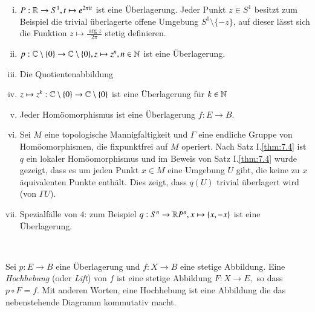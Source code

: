 \documentclass[a4paper,10pt]{scrartcl}
\begin{document}
\begin{exs*}
 \begin{enumerate}[(i)]
  \item $P: \mathbb{R}\to S^1, t\mapsto e^{2\pi it}$ ist eine Überlagerung. Jeder Punkt $z\in S^1$ besitzt zum Beispiel die trivial überlagerte offene Umgebung $S^1\setminus\{-z\}$, 
auf dieser lässt sich die Funktion $z\mapsto \frac{\arg{z}}{2\pi}$ stetig definieren. \\
\fixme[fig70]
  \item $p:\mathbb{C}\setminus\{0\}\to \mathbb{C} \setminus\{0\}, z \mapsto z^n, n\in \mathbb{N}$ ist eine Überlagerung.
  \item Die Quotientenabbildung 
  \item $z\mapsto z^k: \mathbb{C} \setminus \{0\} \to \mathbb{C} \setminus\{0\}$ ist eine Überlagerung für $k\in \mathbb{N}$
  \item Jeder Homöomorphismus ist eine Überlagerung $f: E\to B$.
  \item Sei $M$ eine topologische Mannigfaltigkeit und $\Gamma$ eine endliche Gruppe von Homöomorphismen, 
die fixpunktfrei auf $M$ operiert. Nach Satz I.\ref{thm:7.4} ist $q$ ein lokaler Homöomorphismus und im Beweis von Satz I.\ref{thm:7.4} wurde gezeigt, dass es um jeden Punkt $x\in M$ eine Umgebung $U$ gibt, die keine zu $x$ äquivalenten Punkte enthält. Dies zeigt, dass $q(U)$ trivial überlagert wird (von $\Gamma U$).
  \item Spezialfälle von $4$: zum Beispiel $q: S^n\to \mathbb{R} P^n, x \mapsto \{x, -x\}$ ist eine Überlagerung.\\
\fixme[fig71]
 \end{enumerate}
\end{exs*}
\\
\begin{df}
 Sei $p: E\to B$ eine Überlagerung und $f:X\to B$ eine stetige Abbildung.  Eine \emph{Hochhebung} (oder \emph{Lift}) von $f$ ist eine stetige Abbildung $F: X \to E,$ so dass $p\circ F=f$. Mit anderen Worten, eine Hochhebung ist eine Abbildung die das nebenstehende Diagramm kommutativ macht.\\
\begin{center}
\end{center}

\end{df}
\end{document}
